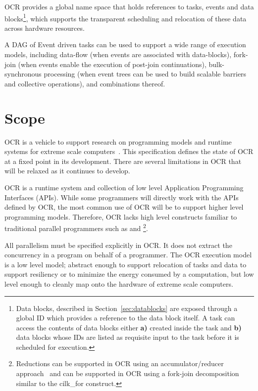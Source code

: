 OCR provides a global name space that holds references to tasks,
events and data blocks\footnote{Data blocks, described in
Section~\ref{sec:datablocks} are exposed through a global ID which
provides a reference to the data block itself. A task can access the
contents of data blocks either {\bf a)} created inside the task and
{\bf b)} data blocks whose IDs are listed as requisite input to the
task before it is scheduled for execution.}, which supports the transparent
scheduling and relocation of these data across hardware resources.

A DAG of Event driven tasks can be used to support a wide range of execution models,
including data-flow (when events are associated with data-blocks),
fork-join (when events enable the execution of post-join
continuations), bulk-synchronous processing (when event trees can be
used to build scalable barriers and collective operations), and
combinations thereof.

\section{Scope}
\label{sec:Scope}

OCR is a vehicle to support research on programming models and
runtime systems for extreme scale
computers~\cite{ExascaleSoftwareStudy2009,SaHS10}. This specification
defines the state of OCR at a fixed point in its development. There
are several limitations in OCR that will be relaxed as it continues to
develop.

OCR is a runtime system and collection of low level Application
Programming Interfaces (APIs). While some programmers will directly
work with the APIs defined by OCR, the most common use of OCR will be
to support higher level programming models. Therefore, OCR lacks high
level constructs familiar to traditional parallel programmers such as
 and \footnote{Reductions can be
supported in OCR using an accumulator/reducer
approach~\cite{Frigo:2009:ROC:1583991.1584017,SCZS13} and
 can be supported in OCR
using a fork-join decomposition similar to the cilk\_for construct.}.

All parallelism must be specified explicitly in OCR. It does not
extract the concurrency in a program on behalf of a programmer. The
OCR execution model is a low level model; abstract enough to support
relocation of tasks and data to support resiliency or to minimize the
energy consumed by a computation, but low level enough to cleanly map
onto the hardware of extreme scale computers.


